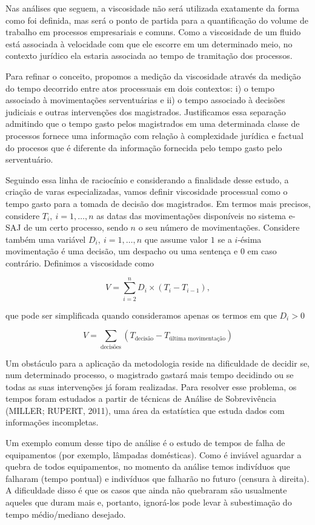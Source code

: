 \documentclass[]{book}
\begin{document}
Nas análises que seguem, a viscosidade não será utilizada exatamente da
forma como foi definida, mas será o ponto de partida para a
quantificação do volume de trabalho em processos empresariais e comuns.
Como a viscosidade de um fluido está associada à velocidade com que ele
escorre em um determinado meio, no contexto jurídico ela estaria
associada ao tempo de tramitação dos processos.

Para refinar o conceito, propomos a medição da viscosidade através da
medição do tempo decorrido entre atos processuais em dois contextos: i)
o tempo associado à movimentações serventuárias e ii) o tempo associado
à decisões judiciais e outras intervenções dos magistrados. Justificamos
essa separação admitindo que o tempo gasto pelos magistrados em uma
determinada classe de processos fornece uma informação com relação à
complexidade jurídica e factual do procesos que é diferente da
informação fornecida pelo tempo gasto pelo serventuário.

Seguindo essa linha de raciocínio e considerando a finalidade desse
estudo, a criação de varas especializadas, vamos definir viscosidade
processual como o tempo gasto para a tomada de decisão dos magistrados.
Em termos mais precisos, considere \(T_i, \ i = 1,\dots,n\) as datas das
movimentações disponíveis no sistema e-SAJ de um certo processo, sendo
\(n\) o seu número de movimentações. Considere também uma variável
\(D_i, \ i = 1,\dots,n\) que assume valor \(1\) se a \(i\)-ésima
movimentação é uma decisão, um despacho ou uma sentença e \(0\) em caso
contrário. Definimos a viscosidade como

\[ 
V = \sum\limits_{i=2}^n D_i \times (T_i - T_{i-1}), 
\]

\noindent que pode ser simplificada quando consideramos apenas os termos
em que \(D_i > 0\)

\[ 
V = \sum\limits_{\text{decisões}} (T_{\text{decisão}} - T_{\text{última movimentação}})
\]

Um obstáculo para a aplicação da metodologia reside na dificuldade de
decidir se, num determinado processo, o magistrado gastará mais tempo
decidindo ou se todas as suas intervenções já foram realizadas. Para
resolver esse problema, os tempos foram estudados a partir de técnicas
de Análise de Sobrevivência (MILLER; RUPERT, 2011), uma área da
estatística que estuda dados com informações incompletas.

Um exemplo comum desse tipo de análise é o estudo de tempos de falha de
equipamentos (por exemplo, lâmpadas domésticas). Como é inviável
aguardar a quebra de todos equipamentos, no momento da análise temos
indivíduos que falharam (tempo pontual) e indivíduos que falharão no
futuro (censura à direita). A dificuldade disso é que os casos que ainda
não quebraram são usualmente aqueles que duram mais e, portanto,
ignorá-los pode levar à subestimação do tempo médio/mediano desejado.
\end{document}
